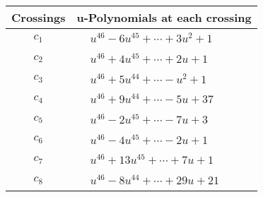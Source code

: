 \documentclass[1p]{elsarticle_modified}
\theoremstyle{definition}
\begin{document}
\begin{tabular}{m{50pt}|m{274pt}}
Crossings & \hspace{64pt}u-Polynomials at each crossing \\
\hline $$\begin{aligned}c_{1}\end{aligned}$$&$\begin{aligned}
&u^{46}-6 u^{45}+\cdots+3 u^2+1
\end{aligned}$\\
\hline $$\begin{aligned}c_{2}\end{aligned}$$&$\begin{aligned}
&u^{46}+4 u^{45}+\cdots+2 u+1
\end{aligned}$\\
\hline $$\begin{aligned}c_{3}\end{aligned}$$&$\begin{aligned}
&u^{46}+5 u^{44}+\cdots- u^2+1
\end{aligned}$\\
\hline $$\begin{aligned}c_{4}\end{aligned}$$&$\begin{aligned}
&u^{46}+9 u^{44}+\cdots-5 u+37
\end{aligned}$\\
\hline $$\begin{aligned}c_{5}\end{aligned}$$&$\begin{aligned}
&u^{46}-2 u^{45}+\cdots-7 u+3
\end{aligned}$\\
\hline $$\begin{aligned}c_{6}\end{aligned}$$&$\begin{aligned}
&u^{46}-4 u^{45}+\cdots-2 u+1
\end{aligned}$\\
\hline $$\begin{aligned}c_{7}\end{aligned}$$&$\begin{aligned}
&u^{46}+13 u^{45}+\cdots+7 u+1
\end{aligned}$\\
\hline $$\begin{aligned}c_{8}\end{aligned}$$&$\begin{aligned}
&u^{46}-8 u^{44}+\cdots+29 u+21
\end{aligned}$\\

\end{tabular}
\end{document}
